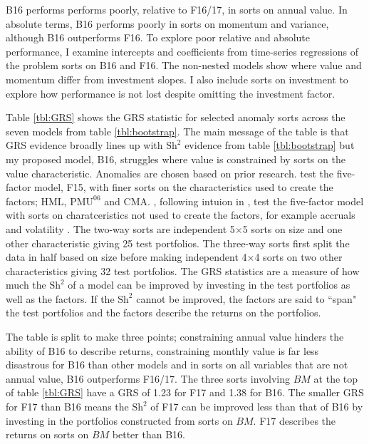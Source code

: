 
B16 performs performs poorly, relative to F16/17, in sorts on annual value.
In absolute terms, B16 performs poorly in sorts on momentum and variance,
although B16 outperforms F16.
To explore poor relative and absolute performance,
I examine intercepts and coefficients from time-series regressions of the
problem sorts on B16 and F16.
The non-nested models show where value and momentum differ from investment
slopes.
I also include sorts on investment to explore how performance is not lost
despite omitting the investment factor.

Table \ref{tbl:GRS} shows the GRS statistic for selected anomaly sorts across
the seven models from table \ref{tbl:bootstrap}.
The main message of the table is that GRS evidence broadly lines up with
$\text{Sh}^2$ evidence from table \ref{tbl:bootstrap} but my proposed model,
B16, struggles where value is constrained by sorts on the value characteristic.
Anomalies are chosen based on prior research.
\textcite{fama2015five} test the five-factor model, F15, with finer sorts on
the characteristics used to create the factors; $\text{HML}$,
$\text{PMU}^{06}$ and $\text{CMA}$.
\textcite{fama2016dissecting}, following intuion in
\textcite{lewellen2010skeptical}, test the five-factor model with sorts on
charatceristics not used to create the factors, for example accruals
\parencite{sloan1996stock} and volatility \parencite{ang2006cross}.
The two-way sorts are independent 5$\times$5 sorts on size and one other
characteristic giving 25 test portfolios.
The three-way sorts first split the data in half based on size before making
independent 4$\times$4 sorts on two other characteristics giving 32 test
portfolios.
The GRS statistics are a measure of how much the $\text{Sh}^2$ of a model can
be improved by investing in the test portfolios as well as the factors.
If the $\text{Sh}^2$ cannot be improved, the factors are said to ``span" the
test portfolios and the factors describe the returns on the portfolios.

The table is split to make three points;
constraining annual value hinders the ability of B16 to describe returns,
constraining monthly value is far less disastrous for B16 than other models and
in sorts on all variables that are not annual value, B16 outperforms F16/17.
The three sorts involving $BM$ at the top of table \ref{tbl:GRS} have a GRS of
1.23 for F17 and 1.38 for B16.
The smaller GRS for F17 than B16 means the $\text{Sh}^2$ of F17 can be improved
less than that of B16 by investing in the portfolios constructed from sorts on
$BM$.
F17 describes the returns on sorts on $BM$ better than B16.

